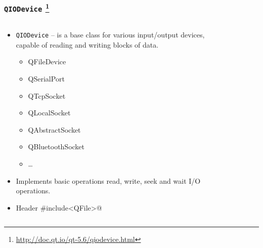 \begin{frame}[fragile]
  \frametitle{\texttt{QIODevice}
    \footnote{\url{http://doc.qt.io/qt-5.6/qiodevice.html}}}
  \small
  \begin{columns}
    \begin{column}{0.68\textwidth}
    \begin{itemize}
    \item \texttt{QIODevice} -- is a base class for various input/output devices,
      capable of reading and writing blocks of data.
    \begin{itemize}
      \item{QFileDevice}
      \item{QSerialPort}
      \item{QTcpSocket}
      \item{QLocalSocket}
      \item{QAbstractSocket}
      \item{QBluetoothSocket}
      \item \ldots
    \end{itemize}
    \item Implements basic operations read, write, seek and wait I/O operations.
    \item Header \verb@#include<QFile>@
    \end{itemize}
    \end{column}
    \begin{column}{0.32\textwidth}
    \begin{figure}[!t]
    \centering

\end{figure}
\end{column}
\end{columns}
\end{frame}
